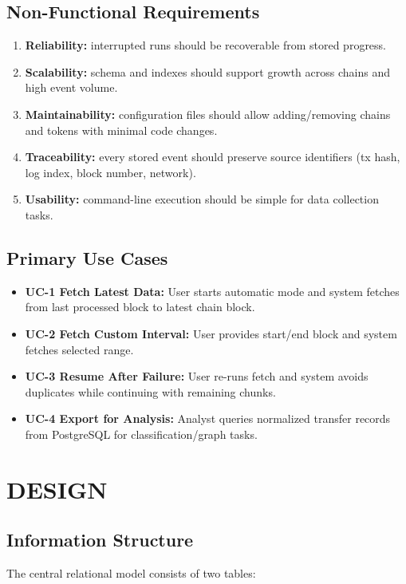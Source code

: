 \documentclass[a4paper,12pt]{report}
\begin{document}
\section*{Non-Functional Requirements}
\begin{enumerate}
\item \textbf{Reliability:} interrupted runs should be recoverable from stored progress.
\item \textbf{Scalability:} schema and indexes should support growth across chains and high event volume.
\item \textbf{Maintainability:} configuration files should allow adding/removing chains and tokens with minimal code changes.
\item \textbf{Traceability:} every stored event should preserve source identifiers
(tx hash, log index, block number, network).
\item \textbf{Usability:} command-line execution should be simple for data collection tasks.
\end{enumerate}

\section*{Primary Use Cases}
\begin{itemize}
\item \textbf{UC-1 Fetch Latest Data:} User starts automatic mode and system fetches from last processed
block to latest chain block.
\item \textbf{UC-2 Fetch Custom Interval:} User provides start/end block and system fetches selected range.
\item \textbf{UC-3 Resume After Failure:} User re-runs fetch and system avoids duplicates while continuing
with remaining chunks.
\item \textbf{UC-4 Export for Analysis:} Analyst queries normalized transfer records from PostgreSQL for
classification/graph tasks.
\end{itemize}


\chapter{DESIGN}

\section{Information Structure}
The central relational model consists of two tables:
\end{document}
